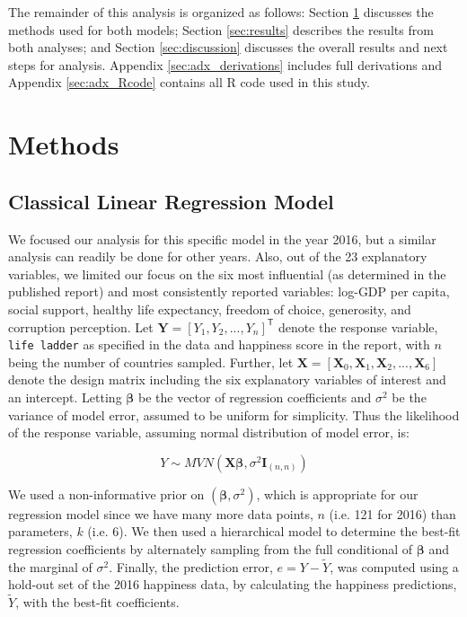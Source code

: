 \documentclass{article}
\begin{document}
The remainder of this analysis is organized as follows: Section \ref{sec:methods} discusses the methods used for both models; Section \ref{sec:results} describes the results from both analyses; and Section \ref{sec:discussion} discusses the overall results and next steps for analysis. Appendix \ref{sec:adx_derivations} includes full derivations and Appendix \ref{sec:adx_Rcode} contains all R code used in this study.

\section{Methods} \label{sec:methods}

\subsection{Classical Linear Regression Model}
We focused our analysis for this specific model in the year 2016, but a similar analysis can readily be done for other years. Also, out of the 23 explanatory variables, we limited our focus on the six most influential (as determined in the published report) and most consistently reported variables: log-GDP per capita, social support, healthy life expectancy, freedom of choice, generosity, and corruption perception.
Let $\boldsymbol{Y} = \left[Y_1, Y_2, ..., Y_n\right]^\mathsf{T}$ denote the response variable, \texttt{life ladder} as specified in the data and happiness score in the report, with $n$ being the number of countries sampled. Further, let $\boldsymbol{X} = \left[\mathbf{X}_{0},\mathbf{X}_{1}, \mathbf{X}_{2}, ..., \mathbf{X}_{6}\right]$ denote the design matrix including the six explanatory variables of interest and an intercept. Letting $\boldsymbol{\beta}$ be the vector of regression coefficients and $\sigma^2$ be the variance of model error, assumed to be uniform for simplicity. Thus the likelihood of the response variable, assuming normal distribution of model error, is:

\begin{equation} 
Y\sim MVN(\boldsymbol{X\beta}, \sigma^2\mathbf{I}_{(n,n)})
\end{equation}

We used a non-informative prior on $(\boldsymbol{\beta}, \sigma^2)$, which is appropriate for our regression model since we have many more data points, $n$ (i.e. 121 for 2016) than parameters, $k$ (i.e. 6). We then used a hierarchical model to determine the best-fit regression coefficients by alternately sampling from the full conditional of $\boldsymbol{\beta}$ and the marginal of $\sigma^2$. Finally, the prediction error, $e = Y - \tilde{Y}$, was computed using a hold-out set of the 2016 happiness data, by calculating the happiness predictions, $\tilde{Y}$, with the best-fit coefficients. \\
\end{document}

